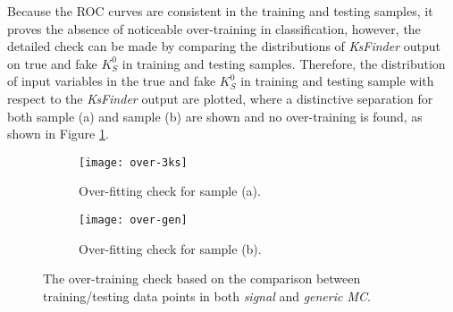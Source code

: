 Because the ROC curves are consistent in the training and testing samples, it proves the absence of noticeable over-training in classification, however, the detailed check can be made by comparing the distributions of \textit{KsFinder} output on true and fake $K_S^0$ in training and testing samples. Therefore, the distribution of input variables in the true and fake $K_S^0$ in training and testing sample with respect to the \textit{KsFinder} output are plotted, where a distinctive separation for both sample (a) and sample (b) are shown and no over-training is found, as shown in Figure \ref{fig:ks_overtraining}.
\begin{figure}[htpb]
	\begin{subfigure}{1\linewidth}
		\centering
		\texttt{[image: over-3ks]}
		\caption{Over-fitting check for sample (a).}
	\end{subfigure}
  	\vspace{0.3cm}

	\begin{subfigure}{1\linewidth}
		\centering
		\texttt{[image: over-gen]}
		\caption{Over-fitting check for sample (b).}
	\end{subfigure}
\caption{The over-training check based on the comparison between training/testing data points in both \textit{signal} and \textit{generic MC}.}
\label{fig:ks_overtraining}
	\vspace{0.3cm}
	
\end{figure}
